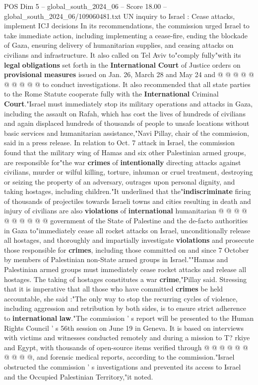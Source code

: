 \begin{textsample}{POS Dim 5 – global\_south\_2024\_06 – Score 18.00 – global\_south\_2024\_06/109060481.txt}
UN inquiry to Israel : Cease attacks, implement ICJ decisions In its recommendations, the commission urged Israel to take immediate action, including implementing a cease-fire, ending the blockade of Gaza, ensuring delivery of humanitarian supplies, and ceasing attacks on civilians and infrastructure.
It also called on Tel Aviv to"comply fully"with its \textbf{legal} \textbf{obligations} set forth in the \textbf{International} \textbf{Court} of Justice orders on \textbf{provisional} \textbf{measures} issued on Jan. 26, March 28 and May 24 and @ @ @ @ @ @ @ @ @ @ to conduct investigations.
It also recommended that all state parties to the Rome Statute cooperate fully with the \textbf{International} Criminal \textbf{Court}."Israel must immediately stop its military operations and attacks in Gaza, including the assault on Rafah, which has cost the lives of hundreds of civilians and again displaced hundreds of thousands of people to unsafe locations without basic services and humanitarian assistance,"Navi Pillay, chair of the commission, said in a press release.
In relation to Oct. 7 attack in Israel, the commission found that the military wing of Hamas and six other Palestinian armed groups, are responsible for"the war \textbf{crimes} of \textbf{intentionally} directing attacks against civilians, murder or wilful killing, torture, inhuman or cruel treatment, destroying or seizing the property of an adversary, outrages upon personal dignity, and taking hostages, including children."It underlined that the"\textbf{indiscriminate} firing of thousands of projectiles towards Israeli towns and cities resulting in death and injury of civilians are also \textbf{violations} of \textbf{international} humanitarian @ @ @ @ @ @ @ @ @ @ government of the State of Palestine and the de-facto authorities in Gaza to"immediately cease all rocket attacks on Israel, unconditionally release all hostages, and thoroughly and impartially investigate \textbf{violations} and prosecute those responsible for \textbf{crimes}, including those committed on and since 7 October by members of Palestinian non-State armed groups in Israel.""Hamas and Palestinian armed groups must immediately cease rocket attacks and release all hostages.
The taking of hostages constitutes a war \textbf{crime},"Pillay said.
Stressing that it is imperative that all those who have committed \textbf{crimes} be held accountable, she said :"The only way to stop the recurring cycles of violence, including aggression and retribution by both sides, is to ensure strict adherence to \textbf{international} \textbf{law}."The commission ' s report will be presented to the Human Rights Council ' s 56th session on June 19 in Geneva.
It is based on interviews with victims and witnesses conducted remotely and during a mission to T? rkiye and Egypt, with thousands of open-source items verified through @ @ @ @ @ @ @ @ @ @, and forensic medical reports, according to the commission."Israel obstructed the commission ' s investigations and prevented its access to Israel and the Occupied Palestinian Territory,"it noted.


\end{textsample}
